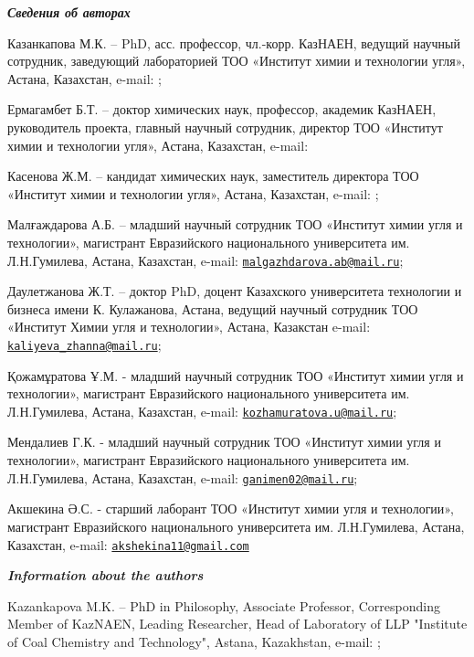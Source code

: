 \emph{{\bfseries Сведения об авторах}}

Казанкапова М.К. -- PhD, асс. профессор, чл.-корр. КазНАЕН, ведущий
научный сотрудник, заведующий лабораторией ТОО «Институт химии и
технологии угля», Астана, Казахстан, e-mail:
\href{mailto:maira_1986@mail.ru}{};

Ермагамбет Б.Т. -- доктор химических наук, профессор, академик КазНАЕН,
руководитель проекта, главный научный сотрудник, директор ТОО «Институт
химии и технологии угля», Астана, Казахстан, e-mail:


Касенова Ж.М. -- кандидат химических наук, заместитель директора ТОО
«Институт химии и технологии угля», Астана, Казахстан, e-mail:
\href{mailto:zhanar_k_68@mail.ru}{};

Малғаждарова А.Б. -- младший научный сотрудник ТОО «Институт химии угля
и технологии», магистрант Евразийского национального университета им.
Л.Н.Гумилева, Астана, Казахстан, e-mail:
\href{mailto:malgazhdarova.ab@mail.ru}{\nolinkurl{malgazhdarova.ab@mail.ru}};

Даулетжанова Ж.Т. -- доктор PhD, доцент Казахского университета
технологии и бизнеса имени К. Кулажанова, Астана, ведущий научный
сотрудник ТОО «Институт Химии угля и технологии», Астана, Казакстан
e-mail:
\href{mailto:kaliyeva_zhanna@mail.ru}{\nolinkurl{kaliyeva\_zhanna@mail.ru}};

Қожамұратова Ұ.М. - младший научный сотрудник ТОО «Институт химии угля и
технологии», магистрант Евразийского национального университета им.
Л.Н.Гумилева, Астана, Казахстан, e-mail:
\href{mailto:kozhamuratova.u@mail.ru}{\nolinkurl{kozhamuratova.u@mail.ru}};

Мендалиев Г.К. - младший научный сотрудник ТОО «Институт химии угля и
технологии», магистрант Евразийского национального университета им.
Л.Н.Гумилева, Астана, Казахстан, e-mail:
\href{mailto:ganimen02@mail.ru}{\nolinkurl{ganimen02@mail.ru}};

Акшекина Ә.С. - старший лаборант ТОО «Институт химии угля и технологии»,
магистрант Евразийского национального университета им. Л.Н.Гумилева,
Астана, Казахстан, e-mail:
\href{mailto:akshekina11@gmail.com}{\nolinkurl{akshekina11@gmail.com}}

\emph{{\bfseries Information about the authors}}

Kazankapova M.K. -- PhD in Philosophy, Associate Professor,
Corresponding Member of KazNAEN, Leading Researcher, Head of Laboratory
of LLP "Institute of Coal Chemistry and Technology", Astana, Kazakhstan,
e-mail: \href{mailto:maira_1986@mail.ru}{};

